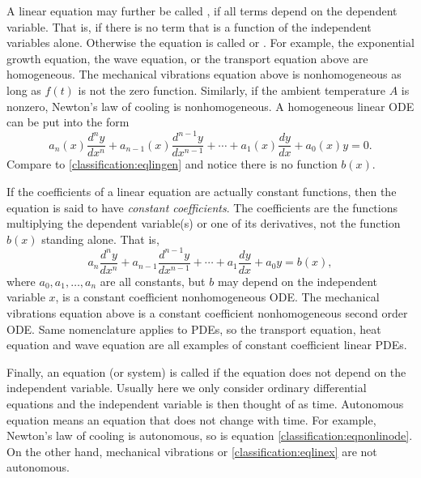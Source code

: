 \medskip

A linear equation may further be called \emph{}, if
all terms depend on the dependent variable.  That is, if there is no
term that is a function of the independent variables alone.  Otherwise the
equation is called \emph{} or
\emph{}.  For example,
the exponential growth equation, the wave equation, or the transport equation above
are homogeneous. The mechanical vibrations equation above is nonhomogeneous
as long as $f(t)$ is not the zero function.  Similarly, if the ambient temperature $A$ is nonzero,
Newton's law of cooling is nonhomogeneous.
A homogeneous linear ODE can be put into the form
\begin{equation*}
a_n(x) \frac{d^n y}{dx^n} + 
a_{n-1}(x) \frac{d^{n-1} y}{dx^{n-1}} + 
\cdots
+
a_{1}(x) \frac{dy}{dx}
+
a_{0}(x) y = 0 .
\end{equation*}
Compare to \eqref{classification:eqlingen} and notice there is no
function $b(x)$.

\medskip

If the coefficients of a linear equation are actually constant functions,
then the equation is said to have
\emph{constant coefficients}.
The coefficients are the functions multiplying the dependent
variable(s) or one of its derivatives, not the function $b(x)$ standing alone.
That is,
\begin{equation*}
a_n \frac{d^n y}{dx^n} + 
a_{n-1} \frac{d^{n-1} y}{dx^{n-1}} + 
\cdots
+
a_{1} \frac{dy}{dx}
+
a_{0} y = b(x) ,
\end{equation*}
where $a_0, a_1, \ldots, a_n$ are all constants,
but $b$ may depend on 
the independent variable $x$,
is a constant coefficient nonhomogeneous ODE.
The mechanical vibrations equation
above is a constant coefficient nonhomogeneous second order ODE\@.
Same nomenclature applies to PDEs, so the transport equation,
heat equation and wave equation are all examples of constant coefficient
linear PDEs.

\medskip

Finally, an equation (or system) is called \emph{}
if the equation does not depend on the independent variable.
Usually here we only consider ordinary differential equations and the
independent variable is then thought of as time.  Autonomous equation
means an equation that does not change with time.
For example, Newton's law of cooling is autonomous, so is equation
\eqref{classification:eqnonlinode}.  On the other hand, mechanical
vibrations or 
\eqref{classification:eqlinex} are not autonomous.

